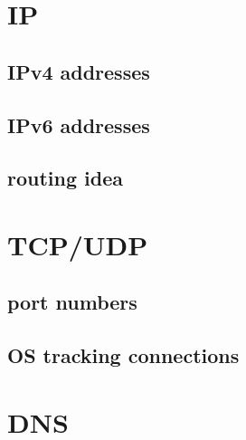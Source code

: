 % 



\section{IP}


\subsection{IPv4 addresses}


\subsection{IPv6 addresses}


\subsection{routing idea}


% 

\section{TCP/UDP}

\subsection{port numbers}




\subsection{OS tracking connections}
% 


\section{DNS}


